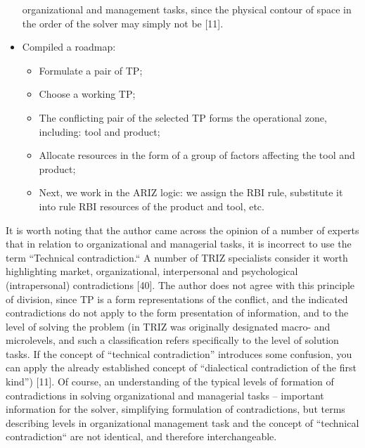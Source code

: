 \begin{itemize}
    organizational and management tasks, since the physical contour of space
    in the order of the solver may simply not be [11].
\item Compiled a roadmap:
  \begin{itemize}
  \item Formulate a pair of TP;
  \item Choose a working TP;
  \item The conflicting pair of the selected TP forms the operational zone,
    including: tool and product;
  \item Allocate resources in the form of a group of factors affecting the
    tool and product;
  \item Next, we work in the ARIZ logic: we assign the RBI rule, substitute it
    into rule RBI resources of the product and tool, etc.
  \end{itemize}
\end{itemize}
It is worth noting that the author came across the opinion of a number of
experts that in relation to organizational and managerial tasks, it is
incorrect to use the term “Technical contradiction.“ A number of TRIZ
specialists consider it worth highlighting market, organizational,
interpersonal and psychological (intrapersonal) contradictions [40]. The
author does not agree with this principle of division, since TP is a form
representations of the conflict, and the indicated contradictions do not apply
to the form presentation of information, and to the level of solving the
problem (in TRIZ was originally designated macro- and microlevels, and such a
classification refers specifically to the level of solution tasks. If the
concept of “technical contradiction” introduces some confusion, you can apply
the already established concept of “dialectical contradiction of the first
kind”) [11].  Of course, an understanding of the typical levels of formation
of contradictions in solving organizational and managerial tasks -- important
information for the solver, simplifying formulation of contradictions, but
terms describing levels in organizational management task and the concept of
“technical contradiction“ are not identical, and therefore interchangeable.

